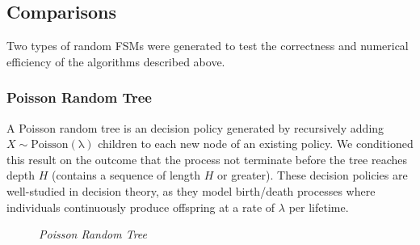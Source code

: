 \subsection{Comparisons}
Two types of random FSMs were generated to test the correctness and numerical efficiency of the 
algorithms described above.
\subsubsection{Poisson Random Tree}
A Poisson random tree is an decision policy generated by recursively adding
      $X\sim\operatorname{Poisson(\lambda)}$ children to each new node of 
      an existing policy.
      We conditioned this result on the outcome that the  process not terminate before the tree 
      reaches depth $H$ (contains a sequence of length $H$ or greater).
      These decision policies are well-studied in decision theory, as they model birth/death processes where
      individuals continuously produce
      offspring at a rate of $\lambda$ per lifetime.
\begin{figure}
\centering
{}
\caption{\emph{Poisson Random Tree}}
\end{figure}
